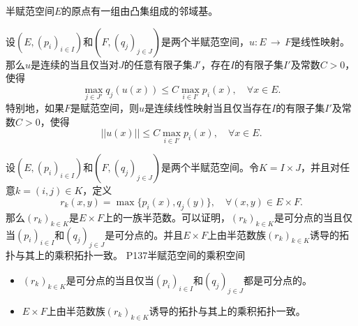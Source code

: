 \begin{theorem}
	半赋范空间$E$的原点有一组由凸集组成的邻域基。
\end{theorem}

\begin{theorem}
	设$(E,(p_{i})_{i\in I}) $和$(F,(q_{j})_{j\in J}) $是两个半赋范空间，$ u: E\, \rightarrow \, F$是线性映射。那么$u$是连续的当且仅当对$J$的任意有限子集$J' $，存在$I$的有限子集$I'$及常数$C>0$，使得
	\begin{equation*}
		\max_{j\in J'} q_{j}(u(x))\leq C\max_{i\in I'} p_{i}(x),\quad \forall x\in E.
	\end{equation*}
	特别地，如果$F$是赋范空间，则$u$是连续线性映射当且仅当存在$I$的有限子集$I' $及常数$C>0 $，使得
	\begin{equation*}
		||u(x)||\leq C\max_{i\in I'}p_{i}(x),\quad \forall x\in E.
	\end{equation*}
\end{theorem}

\original
{
	设$(E,(p_{i})_{i\in I}) $和$(F,(q_{j})_{j\in J}) $是两个半赋范空间。令$K=I\times J $，并且对任意$k=(i,j) \in K $，定义
	\begin{equation*}
		r_{k}(x,y)=\max\{p_{i}(x),q_{j}(y)\},\quad \forall (x,y)\in E\times F.
	\end{equation*}
	那么$(r_{k})_{k\in K}$是$E\times F $上的一族半范数。可以证明，$(r_{k})_{k\in K} $是可分点的当且仅当$(p_{i})_{i\in I} $和$(q_{j})_{j\in J} $是可分点的。并且$E\times F$上由半范数族$(r_{k})_{k\in K} $诱导的拓扑与其上的乘积拓扑一致。
}
{P137半赋范空间的乘积空间}
\begin{proposition}
	\begin{itemize}
		\item $(r_{k})_{k\in K} $是可分点的当且仅当$(p_{i})_{i\in I} $和$(q_{j})_{j\in J} $都是可分点的。
		\item $E\times F$上由半范数族$(r_{k})_{k\in K} $诱导的拓扑与其上的乘积拓扑一致。
	\end{itemize}
\end{proposition}

